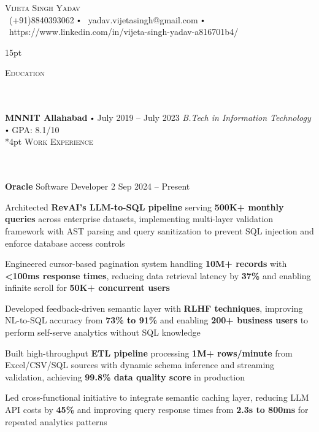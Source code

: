 \documentclass{article}
\newcommand{\contact}[3]{
\vspace*{5pt}
\begin{center}
{\LARGE \scshape {#1}}\\
\vspace{3pt}
#2 
\vspace{2pt}
#3
\end{center}
\vspace*{-8pt}
}
\newcommand{\header}[1]{{
\hspace*{-15pt}\vspace*{6pt} \textsc{#1}} \vspace*{-6pt} 
\lineunder
}
\newcommand{\lineunder}{
\vspace*{-8pt} \\ \hspace*{-18pt} 
\hrulefill \\
}
\newcommand{\school}[4]{
\textbf{#1} \labelitemi #2 \hfill #3 \\ #4 \vspace*{5pt}
}
\newcommand{\employer}[4]{{
\vspace*{2pt}%
\textbf{#1} #2 \hfill #3\\ #4 \vspace*{2pt}}
}
\renewcommand{\labelitemi}{
$\vcenter{\hbox{\tiny$\bullet$}}$\hspace*{3pt}
}
\renewcommand{\labelitemii}{
$\vcenter{\hbox{\tiny$\bullet$}}$\hspace*{-3pt}
}
\newenvironment{bullet-list-minor}{
\begin{list}{\labelitemii}{\setlength\leftmargin{15pt} 
\topsep 0pt \itemsep -2pt}}{\vspace*{4pt}\end{list}
}
\begin{document}
\small
\smallskip
\vspace*{-44pt}

\contact{Vijeta Singh Yadav}
{\faPhone\ (+91)8840393062 \labelitemi \faEnvelope\ yadav.vijetasingh@gmail.com \labelitemi \faLinkedin\ https://www.linkedin.com/in/vijeta-singh-yadav-a816701b4/}

\vspace{15pt}

\header{Education}
    \school{MNNIT Allahabad}{July 2019 -- July 2023}
    {\textit{B.Tech in Information Technology \labelitemi } GPA: 8.1/10}

\vspace*{4pt}%
\header{Work Experience}
\employer{Oracle}{Software Developer 2}{Sep 2024 -- Present}{}
\begin{bullet-list-minor}
\item Architected \textbf{RevAI's LLM-to-SQL pipeline} serving \textbf{500K+ monthly queries} across enterprise datasets, implementing multi-layer validation framework with AST parsing and query sanitization to prevent SQL injection and enforce database access controls
\item Engineered cursor-based pagination system handling \textbf{10M+ records} with \textbf{<100ms response times}, reducing data retrieval latency by \textbf{37\%} and enabling infinite scroll for \textbf{50K+ concurrent users}
\item Developed feedback-driven semantic layer with \textbf{RLHF techniques}, improving NL-to-SQL accuracy from \textbf{73\% to 91\%} and enabling \textbf{200+ business users} to perform self-serve analytics without SQL knowledge
\item Built high-throughput \textbf{ETL pipeline} processing \textbf{1M+ rows/minute} from Excel/CSV/SQL sources with dynamic schema inference and streaming validation, achieving \textbf{99.8\% data quality score} in production
\item Led cross-functional initiative to integrate semantic caching layer, reducing LLM API costs by \textbf{45\%} and improving query response times from \textbf{2.3s to 800ms} for repeated analytics patterns
\end{bullet-list-minor}

\vspace{0.2cm}
\end{document}
